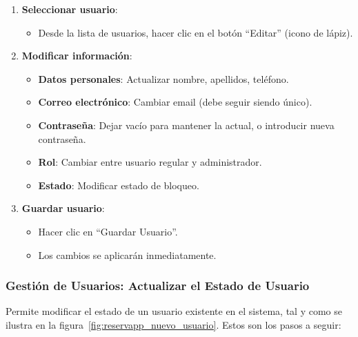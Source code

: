 \begin{enumerate}
   \item \textbf{Seleccionar usuario}:
   \begin{itemize}
      \item Desde la lista de usuarios, hacer clic en el botón ``Editar'' (icono de lápiz).
   \end{itemize}
   \item \textbf{Modificar información}:
   \begin{itemize}
      \item \textbf{Datos personales}: Actualizar nombre, apellidos, teléfono.
      \item \textbf{Correo electrónico}: Cambiar email (debe seguir siendo único).
	  \item \textbf{Contraseña}: Dejar vacío para mantener la actual, o introducir nueva contraseña.
	  \item \textbf{Rol}: Cambiar entre usuario regular y administrador.
	  \item \textbf{Estado}: Modificar estado de bloqueo.
   \end{itemize}
   \item \textbf{Guardar usuario}:
   \begin{itemize}
      \item Hacer clic en ``Guardar Usuario''.
	  \item Los cambios se aplicarán inmediatamente.
   \end{itemize}
\end{enumerate}

\subsubsection{Gestión de Usuarios: Actualizar el Estado de Usuario}
Permite modificar el estado de un usuario existente en el sistema, tal y como se ilustra en la figura~\ref{fig:reservapp_nuevo_usuario}. Estos son los pasos a seguir:

